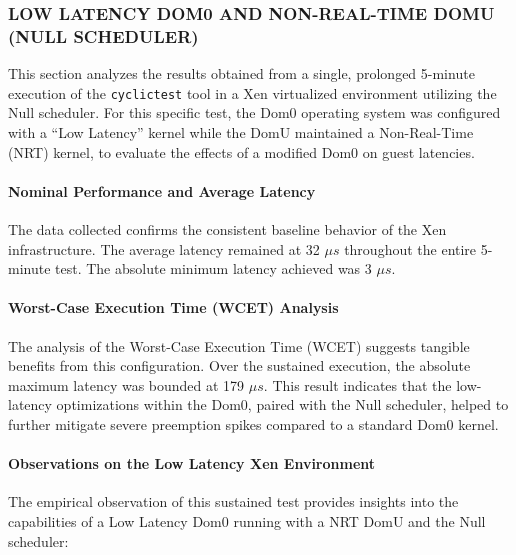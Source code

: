 \subsubsection{LOW LATENCY DOM0 AND NON-REAL-TIME DOMU (NULL
SCHEDULER)}\label{low-latency-dom0-and-non-real-time-domu-null-scheduler}

This section analyzes the results obtained from a single, prolonged
5-minute execution of the \texttt{cyclictest} tool in a Xen virtualized
environment utilizing the Null scheduler. For this specific test, the
Dom0 operating system was configured with a ``Low Latency'' kernel while
the DomU maintained a Non-Real-Time (NRT) kernel, to evaluate the
effects of a modified Dom0 on guest latencies.

\paragraph{Nominal Performance and Average
Latency}\label{nominal-performance-and-average-latency-17}

The data collected confirms the consistent baseline behavior of the Xen
infrastructure. The average latency remained at 32 $\mu s$ throughout the
entire 5-minute test. The absolute minimum latency achieved was 3 $\mu s$.

\paragraph{Worst-Case Execution Time (WCET)
Analysis}\label{worst-case-execution-time-wcet-analysis-19}

The analysis of the Worst-Case Execution Time (WCET) suggests tangible
benefits from this configuration. Over the sustained execution, the
absolute maximum latency was bounded at 179 $\mu s$. This result indicates
that the low-latency optimizations within the Dom0, paired with the Null
scheduler, helped to further mitigate severe preemption spikes compared
to a standard Dom0 kernel.

\paragraph{Observations on the Low Latency Xen
Environment}\label{observations-on-the-low-latency-xen-environment-2}

The empirical observation of this sustained test provides insights into
the capabilities of a Low Latency Dom0 running with a NRT DomU and the
Null scheduler:

